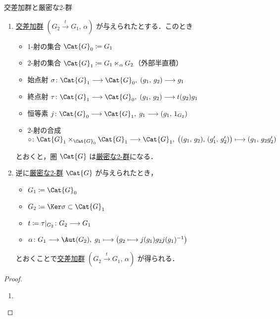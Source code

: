 \documentclass[TQFT_main]{subfiles}
\begin{document}
\begin{myprop}[label=prop:crossed-S2G]{交差加群と厳密な2-群}
    \begin{enumerate}
        \item \hyperref[def:crossed-module]{交差加群} $(G_2 \xrightarrow{t} G_1,\, \alpha)$ が与えられたとする．このとき
        \begin{itemize}
            \item 1-射の集合 $\Cat{G}_0 \coloneqq G_1$
            \item 2-射の集合 $\Cat{G}_1 \coloneqq G_1\ltimes_\alpha G_2$（外部半直積）
            \item 始点射 $\sigma \colon \Cat{G}_1 \lto \Cat{G}_0,\; (g_1,\, g_2) \lto g_1$
            \item 終点射 $\tau \colon \Cat{G}_1 \lto \Cat{G}_0,\; (g_1,\, g_2) \lto t(g_2)g_1$
            \item 恒等素 $j \colon \Cat{G}_0 \lto \Cat{G}_1,\; g_1 \lto (g_1,\, 1_{G_2})$
            \item 2-射の合成 $\circ \colon \Cat{G}_1 \times_{\Cat{G}_0} \Cat{G}_1 \lto \Cat{G}_1,\; \bigl((g_1,\, g_2),\, (g'_1,\, g'_2)\bigr) \lmto (g_1,\, g_2 g'_2)$
        \end{itemize}
        とおくと，圏 $\Cat{G}$ は\hyperref[def:W2G-C2G]{厳密な2-群}になる．
        \item 逆に\hyperref[def:W2G-C2G]{厳密な2-群} $\Cat{G}$ が与えられたとき，
        \begin{itemize}
            \item $G_1 \coloneqq \Cat{G}_0$
            \item $G_2 \coloneqq \Ker \sigma \subset \Cat{G}_1$
            \item $t \coloneqq \tau|_{G_2} \colon G_2 \longrightarrow G_1$
            \item $\alpha \colon G_1 \lto \Aut (G_2),\; g_1 \lmto \bigl( g_2 \lmto j(g_1) g_2 j(g_1)^{-1} \bigr)$
        \end{itemize}
        とおくことで\hyperref[def:crossed-module]{交差加群} $(G_2 \xrightarrow{t} G_1,\, \alpha)$ が得られる．
    \end{enumerate}
    
\end{myprop}

\begin{proof}
    \begin{enumerate}
        \item 
    \end{enumerate}
    
\end{proof}
\end{document}
